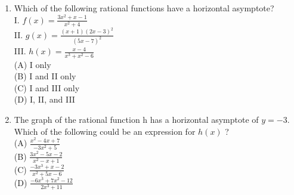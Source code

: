 \documentclass[10pt]{article}
\begin{document}
\begin{enumerate}
  \item Which of the following rational functions have a horizontal asymptote?\\
I. $f(x)=\frac{3 x^{2}+x-1}{x^{2}+4}$\\
II. $g(x)=\frac{(x+1)(2 x-3)^{2}}{(5 x-7)^{2}}$\\
III. $h(x)=\frac{x-4}{x^{3}+x^{2}-6}$\\
(A) I only\\
(B) I and II only\\
(C) I and III only\\
(D) I, II, and III
  \item The graph of the rational function h has a horizontal asymptote of $y=-3$. Which of the following could be an expression for $h(x)$ ?\\
(A) $\frac{x^{2}-4 x+7}{-3 x^{2}+5}$\\
(B) $\frac{3 x^{2}-5 x-2}{x^{2}-x+1}$\\
(C) $\frac{-3 x^{3}+x-2}{x^{2}+5 x-6}$\\
(D) $\frac{-6 x^{3}+7 x^{2}-12}{2 x^{3}+11}$
\end{enumerate}
\end{document}
